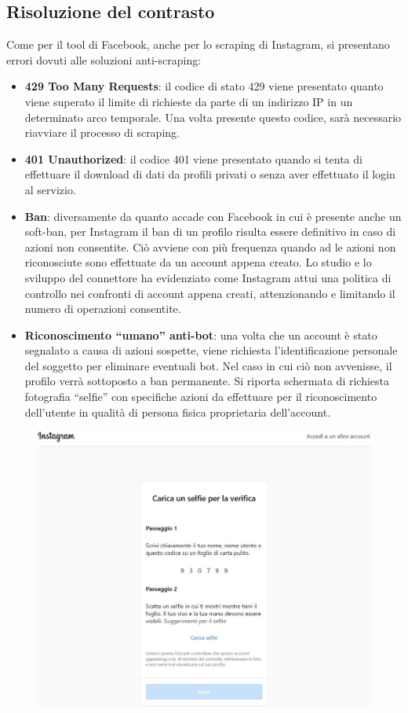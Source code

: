 \subsection{Risoluzione del contrasto} \label{risoluzione_insta}
Come per il tool di Facebook, anche per lo scraping di Instagram, si presentano errori dovuti alle soluzioni anti-scraping:
\begin{itemize}
      \item \textbf{429 Too Many Requests}: il codice di stato 429 viene presentato quanto viene superato il limite di richieste da parte di un indirizzo IP in un determinato arco temporale. Una volta presente questo codice, sar\`a necessario riavviare il processo di scraping.
      \item \textbf{401 Unauthorized}: il codice 401 viene presentato quando si tenta di effettuare il download di dati da profili privati o senza aver effettuato il login al servizio.
      \item \textbf{Ban}: diversamente da quanto accade con Facebook in cui \`e presente anche un soft-ban, per Instagram il ban di un profilo risulta essere definitivo in caso di azioni non consentite. Ci\`o avviene con pi\`u frequenza quando ad le azioni non riconosciute sono effettuate da un account appena creato. Lo studio e lo sviluppo del connettore ha evidenziato come Instagram attui una politica di controllo nei confronti di account appena creati, attenzionando e limitando il numero di operazioni consentite.
      \item \textbf{Riconoscimento ``umano'' anti-bot}: una volta che un account \`e stato segnalato a causa di azioni sospette, viene richiesta l'identificazione personale del soggetto per eliminare eventuali bot. Nel caso in cui ci\`o non avvenisse, il profilo verr\`a sottoposto a ban permanente. Si riporta schermata di richiesta fotografia ``selfie'' con specifiche azioni da effettuare per il riconoscimento dell'utente in qualit\`a di persona fisica proprietaria dell'account.

\end{itemize}
  \begin{figure}[!htb]
          \centering
          \includegraphics[width=400pt]{immagini/login_selfie.jpg}
    \end{figure}
